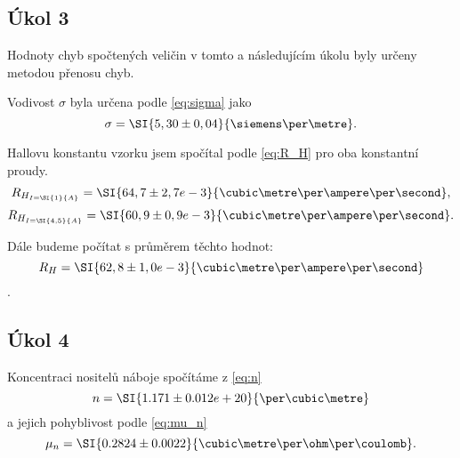 \documentclass[0-protokol.tex]{subfiles}
\begin{document}
\subsection*{Úkol 3}
Hodnoty chyb spočtených veličin v tomto a následujícím úkolu byly určeny metodou přenosu chyb.

Vodivost $\sigma$ byla určena podle \eqref{eq:sigma} jako 
$$\sigma = \SI{5,30 \pm 0,04}{\siemens\per\metre}.$$

Hallovu konstantu vzorku jsem spočítal podle \eqref{eq:R_H} pro oba konstantní proudy.
$$R_{H_{I = \SI{1}{A}}} = \SI{64,7 \pm 2,7 e-3}{\cubic\metre\per\ampere\per\second},$$
$$R_{H_{I = \SI{4,5}{A}}} = \SI{60,9 \pm 0,9 e-3}{\cubic\metre\per\ampere\per\second}.$$

Dále budeme počítat s průměrem těchto hodnot:
$$R_H = \SI{62,8 \pm 1,0 e-3}{\cubic\metre\per\ampere\per\second}$$.

\subsection*{Úkol 4}
Koncentraci nositelů náboje spočítáme z \eqref{eq:n}
$$n = \SI{1.171 \pm 0.012 e+20}{\per\cubic\metre}$$
a jejich pohyblivost podle \eqref{eq:mu_n}
$$\mu_n = \SI{0.2824 \pm 0.0022}{\cubic\metre\per\ohm\per\coulomb}.$$
\end{document}
